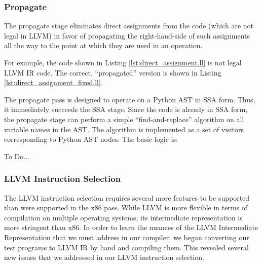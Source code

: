 \documentclass[11pt,twocolumn]{article}
\newenvironment{packed_enum}{
\begin{enumerate}
  \setlength{\itemsep}{1pt}
  \setlength{\parskip}{0pt}
  \setlength{\parsep}{0pt}
}{\end{enumerate}}
\begin{document}
\subsubsection{Propagate}
\label{sec:stage-Propagate}

The propagate stage eliminates direct assignments from the code (which
are not legal in LLVM) in favor of propagating the right-hand-side of
such assignments all the way to the point at which they are used in an
operation. 

For example, the code shown in Listing \ref{lst:direct_assignment.ll}
is not legal LLVM IR code. The correct, ``propagated'' version is
shown in Listing \ref{lst:direct_assignment_fixed.ll}.





The propagate pass is designed to operate on a Python AST in SSA
form. Thus, it immediately succeeds the SSA stage. Since the code is
already in SSA form, the propagate stage can perform a simple
``find-and-replace'' algorithm on all variable names in the AST. The
algorithm is implemented as a set of visitors corresponding to Python
AST nodes. The basic logic is:

\begin{packed_enum}
\item To Do...
\end{packed_enum}

\subsubsection{LLVM Instruction Selection}
\label{sec:stage-LLVMInstructionSelection}

The LLVM instruction selection requires several more features to be
supported than were supported in the x86 pass. While LLVM is more
flexible in terms of compilation on multiple operating systems, its
intermediate representation is more stringent than x86. In order to
learn the nuances of the LLVM Intermediate Representation that we must
address in our compiler, we began converting our test programs
to LLVM IR by hand and compiling them. This revealed several new issues
that we addressed in our LLVM instruction selection.
\end{document}
